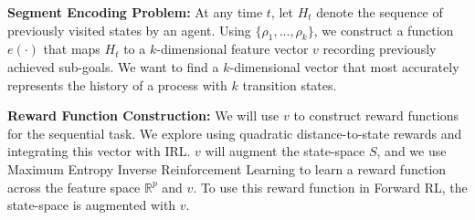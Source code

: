 \noindent\textbf{Segment Encoding Problem: } 
At any time $t$, let $H_t$ denote the sequence of previously visited states by an agent.
Using $\{\rho_1,...,\rho_k\}$, we construct a function $e(\cdot)$ that maps $H_t$ to a $k$-dimensional feature vector $v$ recording previously achieved sub-goals. 
We want to find a $k$-dimensional vector that most accurately represents the history of a process with $k$ transition states.

\vspace{0.5em}

\noindent\textbf{Reward Function Construction: }
We will use $v$ to construct reward functions for the sequential task.
We explore using quadratic distance-to-state rewards and integrating this vector with IRL.
$v$ will augment the state-space $S$, and we use Maximum Entropy Inverse Reinforcement Learning to learn a reward function across the feature space $\mathbb{R}^p$ and $v$. 
To use this reward function in Forward RL, the state-space is augmented with $v$.